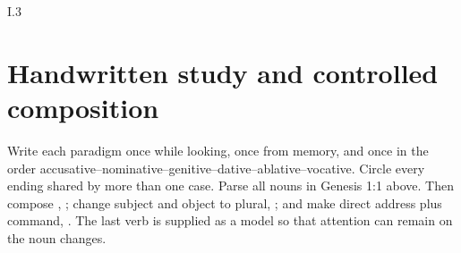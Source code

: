\begin{courseunit}{I.3}
\section{Handwritten study and controlled composition}

Write each paradigm once while looking, once from memory, and once in the
order accusative--nominative--genitive--dative--ablative--vocative. Circle every
ending shared by more than one case. Parse all nouns in Genesis 1:1 above.
Then compose , ; change subject and object to plural, ;
and make direct address plus command, . The last
verb is supplied as a model so that attention can remain on the noun changes.




\end{courseunit}

